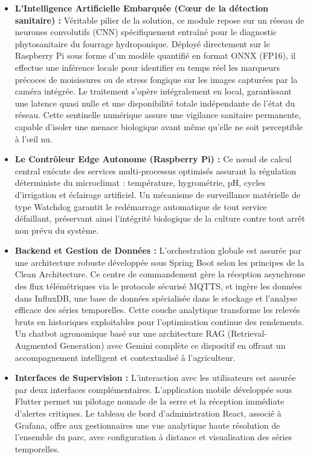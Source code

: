 	\begin{itemize}
		\item \textbf{L’Intelligence Artificielle Embarquée (Cœur de la détection sanitaire) :} Véritable pilier de la solution, ce module repose sur un réseau de neurones convolutifs (CNN) spécifiquement entraîné pour le diagnostic phytosanitaire du fourrage hydroponique. Déployé directement sur le Raspberry Pi sous forme d'un modèle quantifié en format ONNX (FP16), il effectue une inférence locale pour identifier en temps réel les marqueurs précoces de moisissures ou de stress fongique sur les images capturées par la caméra intégrée. Le traitement s'opère intégralement en local, garantissant une latence quasi nulle et une disponibilité totale indépendante de l'état du réseau. Cette sentinelle numérique assure une vigilance sanitaire permanente, capable d'isoler une menace biologique avant même qu'elle ne soit perceptible à l'œil nu.
		
		\item \textbf{Le Contrôleur Edge Autonome (Raspberry Pi) :} Ce nœud de calcul central exécute des services multi-processus optimisés assurant la régulation déterministe du microclimat : température, hygrométrie, pH, cycles d'irrigation et éclairage artificiel. Un mécanisme de surveillance matérielle de type Watchdog garantit le redémarrage automatique de tout service défaillant, préservant ainsi l'intégrité biologique de la culture contre tout arrêt non prévu du système.
		
		\item \textbf{Backend et Gestion de Données :}  L'orchestration globale est assurée par une architecture robuste développée sous Spring Boot selon les principes de la Clean Architecture. Ce centre de commandement gère la réception asynchrone des flux télémétriques via le protocole sécurisé MQTTS, et ingère les données dans InfluxDB, une base de données spécialisée dans le stockage et l'analyse efficace des séries temporelles. Cette couche analytique transforme les relevés bruts en historiques exploitables pour l'optimisation continue des rendements. Un chatbot agronomique basé sur une architecture RAG (Retrieval-Augmented Generation) avec Gemini complète ce dispositif en offrant un accompagnement intelligent et contextualisé à l'agriculteur.
		\item \textbf{Interfaces de Supervision :}  L'interaction avec les utilisateurs est assurée par deux interfaces complémentaires. L'application mobile développée sous Flutter permet un pilotage nomade de la serre et la réception immédiate d'alertes critiques. Le tableau de bord d'administration React, associé à Grafana, offre aux gestionnaires une vue analytique haute résolution de l'ensemble du parc, avec configuration à distance et visualisation des séries temporelles.
	\end{itemize}
